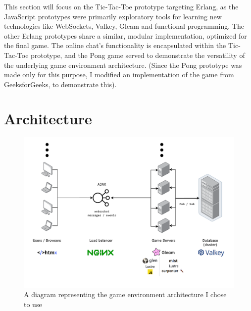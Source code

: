 \documentclass[]{final}
\begin{document}
This section will focus on the Tic-Tac-Toe prototype targeting Erlang,
as the JavaScript prototypes were primarily exploratory tools for learning
new technologies like WebSockets, Valkey, Gleam and functional programming.
The other Erlang prototypes share a similar, modular implementation,
optimized for the final game. The online chat's functionality is
encapsulated within the Tic-Tac-Toe prototype, and the Pong game
served to demonstrate the versatility of the underlying game
environment architecture. (Since the Pong prototype was made only for this purpose,
I modified an implementation of the game from GeeksforGeeks, to demonstrate this).\cite{GeeksforGeeks_pong_2021}

\section{Architecture}

\begin{figure}[ht!]
  \centering
  \includegraphics[width=\linewidth]{architecture}
  \vspace*{-1.5cm}
  \caption{A diagram representing the game environment architecture I chose to use}
  \label{fig: 3}
\end{figure}


\newpage
\end{document}
